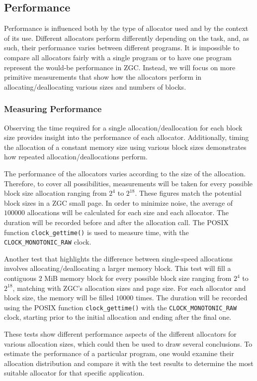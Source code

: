 \subsection{Performance}
Performance is influenced both by the type of allocator used and by the context of its use. Different allocators perform differently depending on the task, and, as such, their performance varies between different programs. It is impossible to compare all allocators fairly with a single program or to have one program represent the would-be performance in ZGC. Instead, we will focus on more primitive measurements that show how the allocators perform in allocating/deallocating various sizes and numbers of blocks.

\subsubsection{Measuring Performance}
Observing the time required for a single allocation/deallocation for each block size provides insight into the performance of each allocator. Additionally, timing the allocation of a constant memory size using various block sizes demonstrates how repeated allocation/deallocations perform.

The performance of the allocators varies according to the size of the allocation. Therefore, to cover all possibilities, measurements will be taken for every possible block size allocation ranging from $2^4$ to $2^{18}$. These figures match the potential block sizes in a ZGC small page. In order to minimize noise, the average of $100 000$ allocations will be calculated for each size and each allocator. The duration will be recorded before and after the allocation call. The POSIX function \texttt{clock\_gettime()} is used to measure time, with the \texttt{CLOCK\_MONOTONIC\_RAW} clock.

Another test that highlights the difference between single-speed allocations involves allocating/deallocating a larger memory block. This test will fill a contiguous $2$ MiB memory block for every possible block size ranging from $2^4$ to $2^{18}$, matching with ZGC's allocation sizes and page size. For each allocator and block size, the memory will be filled $10 000$ times. The duration will be recorded using the POSIX function \texttt{clock\_gettime()} with the \texttt{CLOCK\_MONOTONIC\_RAW} clock, starting prior to the initial allocation and ending after the final one.

These tests show different performance aspects of the different allocators for various allocation sizes, which could then be used to draw several conclusions. To estimate the performance of a particular program, one would examine their allocation distribution and compare it with the test results to determine the most suitable allocator for that specific application.

